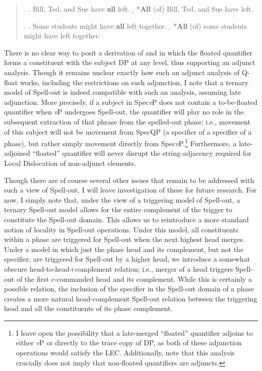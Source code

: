 \singlespacing
\begin{quote}
\ex. \a. Bill, Ted, and Sue have {\bf all} left.
\b. *{\bf All} (of) Bill, Ted, and Sue have left.

\ex. \a. Some students might have {\bf all} left together.
\b. *{\bf All} (of) some students might have left together.

\end{quote}
\onehalfspacing
There is no clear way to posit a derivation of \LLast[a] and \Last[a] in which the floated quantifier forms a constituent with the subject DP at any level, thus supporting an adjunct analysis. Though it remains unclear exactly how such an adjunct analysis of Q-float works, including the restrictions on such adjunction, I note that a ternary model of Spell-out is indeed compatible with such an analysis, assuming late adjunction. More precisely, if a subject in Spec{\it v}P does not contain a to-be-floated quantifier when {\it v}P undergoes Spell-out, the quantifier will play no role in the subsequent extraction of that phrase from the spelled-out phase; i.e., movement of this subject will not be movement from SpecQP (a specifier of a specifier of a phase), but rather simply movement directly from Spec{\it v}P.\footnote{I leave open the possibility that a late-merged ``floated'' quantifier adjoins to either {\it v}P or directly to the trace copy of DP, as both of these adjunction operations would satisfy the LEC. Additionally, note that this analysis crucially does not imply that non-floated quantifiers are adjuncts.} Furthermore, a late-adjoined ``floated'' quantifier will never disrupt the string-adjacency required for Local Dislocation of non-adjunct elements.

Though there are of course several other issues that remain to be addressed with such a view of Spell-out, I will leave investigation of these for future research. For now, I simply note that, under the view of a triggering model of Spell-out, a ternary Spell-out model allows for the entire complement of the trigger to constitute the Spell-out domain. This allows us to reintroduce a more standard notion of locality in Spell-out operations. Under this model, all constituents within a phase are triggered for Spell-out when the next highest head merges. Under a model in which just the phase head and its complement, but not the specifier, are triggered for Spell-out by a higher head, we introduce a somewhat obscure head-to-head+complement relation; i.e., merger of a head triggers Spell-out of the first c-commanded head and its complement. While this is certainly a possible relation, the inclusion of the specifier in the Spell-out domain of a phase creates a more natural head-complement Spell-out relation between the triggering head and all the constituents of its phase complement.

